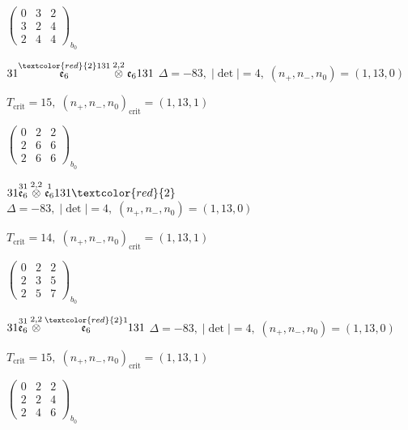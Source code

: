 \documentclass[10pt]{article}
\begin{document}
\hspace{2em}$\left(\begin{smallmatrix}0 & 3 & 2 \\ 3 & 2 & 4 \\ 2 & 4 & 4\end{smallmatrix}\right)_{\!b_0}$

\smallskip

$31\overset{\textcolor{red}{2}131}{\mathfrak{e}_6}\overset{2,2}{\otimes}\mathfrak{e}_6131$ \quad $\Delta=-83,\; |\det|=4,\; (n_+,n_-,n_0)=(1,13,0)$

\hspace{1em}$T_{\text{crit}}=15,\; (n_+,n_-,n_0)_{\text{crit}}=(1,13,1)$

\hspace{2em}$\left(\begin{smallmatrix}0 & 2 & 2 \\ 2 & 6 & 6 \\ 2 & 6 & 6\end{smallmatrix}\right)_{\!b_0}$

\smallskip

$31\overset{31}{\mathfrak{e}_6}\overset{2,2}{\otimes}\overset{1}{\mathfrak{e}_6}131\textcolor{red}{2}$ \quad $\Delta=-83,\; |\det|=4,\; (n_+,n_-,n_0)=(1,13,0)$

\hspace{1em}$T_{\text{crit}}=14,\; (n_+,n_-,n_0)_{\text{crit}}=(1,13,1)$

\hspace{2em}$\left(\begin{smallmatrix}0 & 2 & 2 \\ 2 & 3 & 5 \\ 2 & 5 & 7\end{smallmatrix}\right)_{\!b_0}$

$31\overset{31}{\mathfrak{e}_6}\overset{2,2}{\otimes}\overset{\textcolor{red}{2}1}{\mathfrak{e}_6}131$ \quad $\Delta=-83,\; |\det|=4,\; (n_+,n_-,n_0)=(1,13,0)$

\hspace{1em}$T_{\text{crit}}=15,\; (n_+,n_-,n_0)_{\text{crit}}=(1,13,1)$

\hspace{2em}$\left(\begin{smallmatrix}0 & 2 & 2 \\ 2 & 2 & 4 \\ 2 & 4 & 6\end{smallmatrix}\right)_{\!b_0}$
\end{document}
